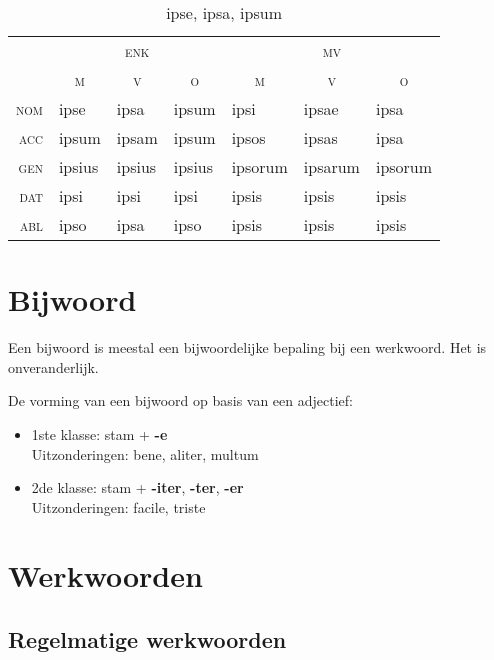 \documentclass[12pt,a4paper]{article}
\begin{document}
\begin{table}[H]
\centering
\begin{tabular}{ r | l l l | l l l }
\toprule
 & \multicolumn{3}{c|}{\textsc{enk}} & \multicolumn{3}{c}{\textsc{mv}} \\
 & \multicolumn{1}{c}{\textsc{m}} & \multicolumn{1}{c}{\textsc{v}} & \multicolumn{1}{c|}{\textsc{o}} & \multicolumn{1}{c}{\textsc{m}} & \multicolumn{1}{c}{\textsc{v}} & \multicolumn{1}{c}{\textsc{o}} \\ 
\midrule
\textsc{nom} & ipse   & ipsa   & ipsum  & ipsi    & ipsae   & ipsa  \\
\textsc{acc} & ipsum  & ipsam  & ipsum  & ipsos   & ipsas   & ipsa  \\
\textsc{gen} & ipsius & ipsius & ipsius & ipsorum & ipsarum & ipsorum \\
\textsc{dat} & ipsi   & ipsi   & ipsi   & ipsis   & ipsis   & ipsis   \\
\textsc{abl} & ipso   & ipsa   & ipso   & ipsis   & ipsis   & ipsis   \\
\bottomrule
\end{tabular}
\caption{ipse, ipsa, ipsum}
\label{tab:ipse}
\end{table}

\section{Bijwoord}

Een bijwoord is meestal een bijwoordelijke bepaling bij een werkwoord. Het is onveranderlijk.

De vorming van een bijwoord op basis van een adjectief:
\begin{itemize}
    \item 1ste klasse: stam + \textbf{-e} \\
    Uitzonderingen: bene, aliter, multum
    \item 2de klasse: stam + \textbf{-iter}, \textbf{-ter}, \textbf{-er} \\
    Uitzonderingen: facile, triste
\end{itemize}

\section{Werkwoorden}

\subsection{Regelmatige werkwoorden}
\end{document}
